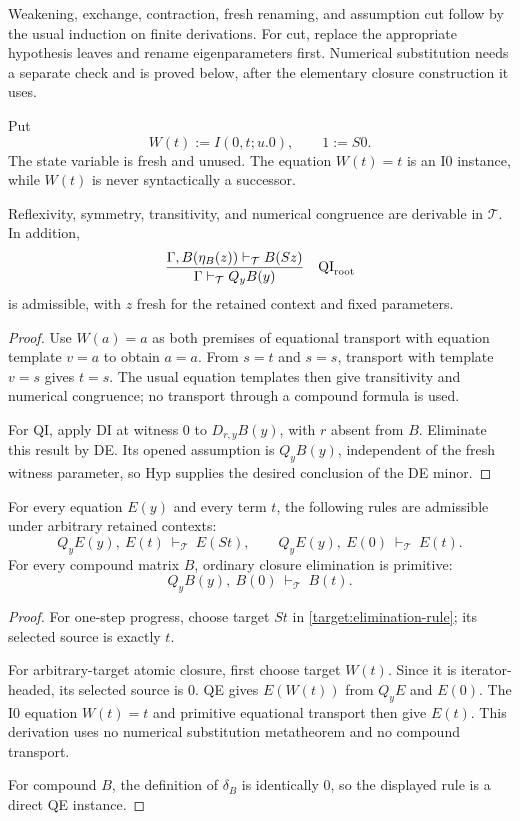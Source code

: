 Weakening, exchange, contraction, fresh renaming, and assumption cut follow
by the usual induction on finite derivations.  For cut, replace the
appropriate hypothesis leaves and rename eigenparameters first.  Numerical
substitution needs a separate check and is proved below, after the elementary
closure construction it uses.

Put
\begin{equation}
 W(t):=I(0,t;u.0),\qquad 1:=S0.
 \label{target:wrapper}
\end{equation}
The state variable is fresh and unused.  The equation $W(t)=t$ is an I0
instance, while $W(t)$ is never syntactically a successor.

\begin{lemma}
\label{target:eq-qi}
Reflexivity, symmetry, transitivity, and numerical congruence are derivable
in $\mathcal T$.  In addition,
\[
 \frac{\Gamma,B(\eta_B(z))\vdash_{\mathcal T}B(Sz)}
      {\Gamma\vdash_{\mathcal T}Q_yB(y)}
 \quad\mathrm{QI}_{\rm root}
\]
is admissible, with $z$ fresh for the retained context and fixed parameters.
\end{lemma}
\begin{proof}
Use $W(a)=a$ as both premises of equational transport with equation template
$v=a$ to obtain $a=a$.  From $s=t$ and $s=s$, transport with template
$v=s$ gives $t=s$.  The usual equation templates then give transitivity and
numerical congruence; no transport through a compound formula is used.

For QI, apply DI at witness $0$ to $D_{r,y}B(y)$, with $r$ absent from
$B$.  Eliminate this result by DE.  Its opened assumption is $Q_yB(y)$,
independent of the fresh witness parameter, so Hyp supplies the desired
conclusion of the DE minor.
\end{proof}

\begin{lemma}
\label{target:closure-interfaces}
For every equation $E(y)$ and every term $t$, the following rules are
admissible under arbitrary retained contexts:
\[
 Q_yE(y),\ E(t)\ \vdash_{\mathcal T}\ E(St),
 \qquad
 Q_yE(y),\ E(0)\ \vdash_{\mathcal T}\ E(t).
 \tag{Atomic interfaces}\label{target:atomic-interfaces}
\]
For every compound matrix $B$, ordinary closure elimination is primitive:
\[
 Q_yB(y),\ B(0)\ \vdash_{\mathcal T}\ B(t).
 \tag{Compound interface}\label{target:compound-interface}
\]
\end{lemma}
\begin{proof}
For one-step progress, choose target $St$ in
\eqref{target:elimination-rule}; its selected source is exactly $t$.

For arbitrary-target atomic closure, first choose target $W(t)$.  Since it
is iterator-headed, its selected source is $0$.  QE gives $E(W(t))$ from
$Q_yE$ and $E(0)$.  The I0 equation $W(t)=t$ and primitive equational
transport then give $E(t)$.  This derivation uses no numerical substitution
metatheorem and no compound transport.

For compound $B$, the definition of $\delta_B$ is identically $0$, so the
displayed rule is a direct QE instance.
\end{proof}


